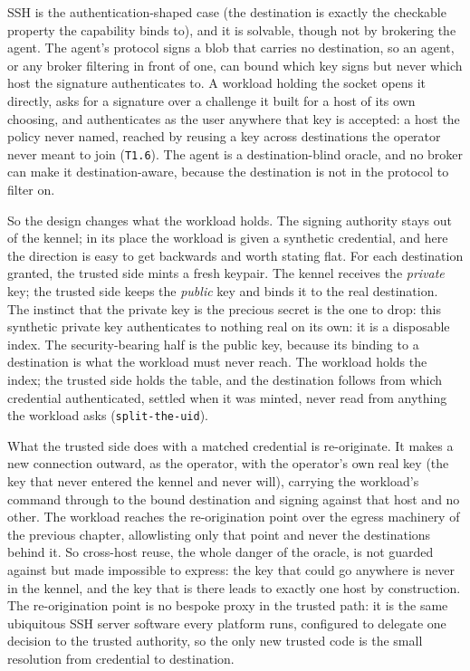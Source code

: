 SSH is the authentication-shaped case (the destination is exactly the
checkable property the capability binds to), and it is solvable, though
not by brokering the agent. The agent's protocol signs a blob that
carries no destination, so an agent, or any broker filtering in front of
one, can bound which key signs but never which host the signature
authenticates to. A workload holding the socket opens it directly, asks
for a signature over a challenge it built for a host of its own
choosing, and authenticates as the user anywhere that key is accepted: a
host the policy never named, reached by reusing a key across
destinations the operator never meant to join (\texttt{T1.6}). The agent
is a destination-blind oracle, and no broker can make it
destination-aware, because the destination is not in the protocol to
filter on.

So the design changes what the workload holds. The signing authority
stays out of the kennel; in its place the workload is given a synthetic
credential, and here the direction is easy to get backwards and worth
stating flat. For each destination granted, the trusted side mints a
fresh keypair. The kennel receives the \emph{private} key; the trusted
side keeps the \emph{public} key and binds it to the real destination.
The instinct that the private key is the precious secret is the one to
drop: this synthetic private key authenticates to nothing real on its
own: it is a disposable index. The security-bearing half is the public
key, because its binding to a destination is what the workload must
never reach. The workload holds the index; the trusted side holds the
table, and the destination follows from which credential authenticated,
settled when it was minted, never read from anything the workload asks
(\texttt{split-the-uid}).

What the trusted side does with a matched credential is re-originate. It
makes a new connection outward, as the operator, with the operator's own
real key (the key that never entered the kennel and never will),
carrying the workload's command through to the bound destination and
signing against that host and no other. The workload reaches the
re-origination point over the egress machinery of the previous chapter,
allowlisting only that point and never the destinations behind it. So
cross-host reuse, the whole danger of the oracle, is not guarded against
but made impossible to express: the key that could go anywhere is never
in the kennel, and the key that is there leads to exactly one host by
construction. The re-origination point is no bespoke proxy in the
trusted path: it is the same ubiquitous SSH server software every
platform runs, configured to delegate one decision to the trusted
authority, so the only new trusted code is the small resolution from
credential to destination.

